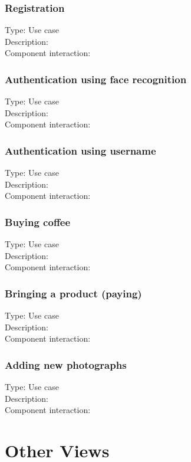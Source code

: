\documentclass[11pt]{article}
\begin{document}
\subsubsection{Registration}
Type: Use case\\
Description:\\
Component interaction:\\
   
\subsubsection{Authentication using face recognition}
Type: Use case\\
Description:\\
Component interaction:\\
   
\subsubsection{Authentication using username}
Type: Use case\\
Description:\\
Component interaction:\\

\subsubsection{Buying coffee}
Type: Use case\\
Description:\\
Component interaction:\\

\subsubsection{Bringing a product (paying)}
Type: Use case\\
Description:\\
Component interaction:\\

\subsubsection{Adding new photographs}
Type: Use case\\
Description:\\
Component interaction:\\


\section{Other Views}
\end{document}
